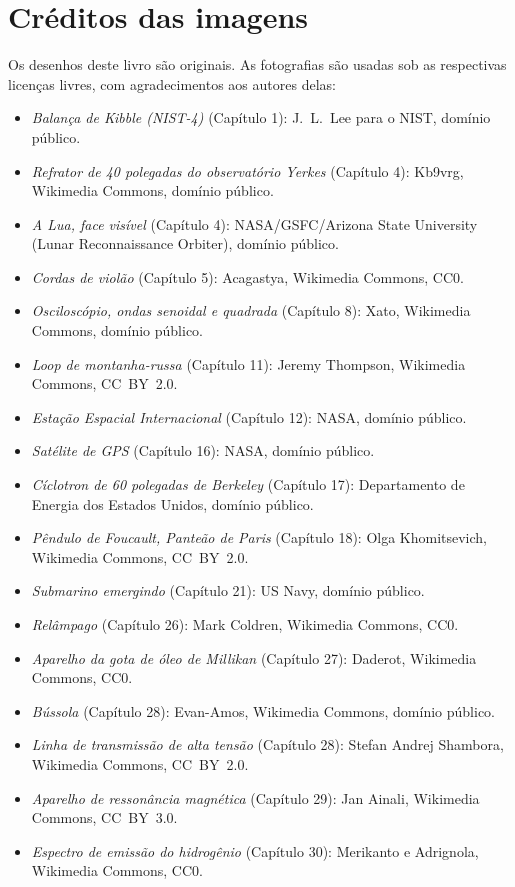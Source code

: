 \chapter*{Créditos das imagens}

Os desenhos deste livro são originais. As fotografias são usadas sob
as respectivas licenças livres, com agradecimentos aos autores delas:

\begin{itemize}
  \item \emph{Balança de Kibble (NIST-4)} (Capítulo 1): J.~L.~Lee
        para o NIST, domínio público.
  \item \emph{Refrator de 40 polegadas do observatório Yerkes}
        (Capítulo 4): Kb9vrg, Wikimedia Commons, domínio público.
  \item \emph{A Lua, face visível} (Capítulo 4):
        NASA/GSFC/Arizona State University (Lunar Reconnaissance
        Orbiter), domínio público.
  \item \emph{Cordas de violão} (Capítulo 5): Acagastya, Wikimedia
        Commons, CC0.
  \item \emph{Osciloscópio, ondas senoidal e quadrada} (Capítulo 8):
        Xato, Wikimedia Commons, domínio público.
  \item \emph{Loop de montanha-russa} (Capítulo 11): Jeremy Thompson,
        Wikimedia Commons, CC~BY~2.0.
  \item \emph{Estação Espacial Internacional} (Capítulo 12): NASA,
        domínio público.
  \item \emph{Satélite de GPS} (Capítulo 16): NASA, domínio público.
  \item \emph{Cíclotron de 60 polegadas de Berkeley} (Capítulo 17):
        Departamento de Energia dos Estados Unidos, domínio público.
  \item \emph{Pêndulo de Foucault, Panteão de Paris} (Capítulo 18):
        Olga Khomitsevich, Wikimedia Commons, CC~BY~2.0.
  \item \emph{Submarino emergindo} (Capítulo 21): US Navy, domínio
        público.
  \item \emph{Relâmpago} (Capítulo 26): Mark Coldren, Wikimedia
        Commons, CC0.
  \item \emph{Aparelho da gota de óleo de Millikan} (Capítulo 27):
        Daderot, Wikimedia Commons, CC0.
  \item \emph{Bússola} (Capítulo 28): Evan-Amos, Wikimedia Commons,
        domínio público.
  \item \emph{Linha de transmissão de alta tensão} (Capítulo 28):
        Stefan Andrej Shambora, Wikimedia Commons, CC~BY~2.0.
  \item \emph{Aparelho de ressonância magnética} (Capítulo 29): Jan
        Ainali, Wikimedia Commons, CC~BY~3.0.
  \item \emph{Espectro de emissão do hidrogênio} (Capítulo 30):
        Merikanto e Adrignola, Wikimedia Commons, CC0.
\end{itemize}

